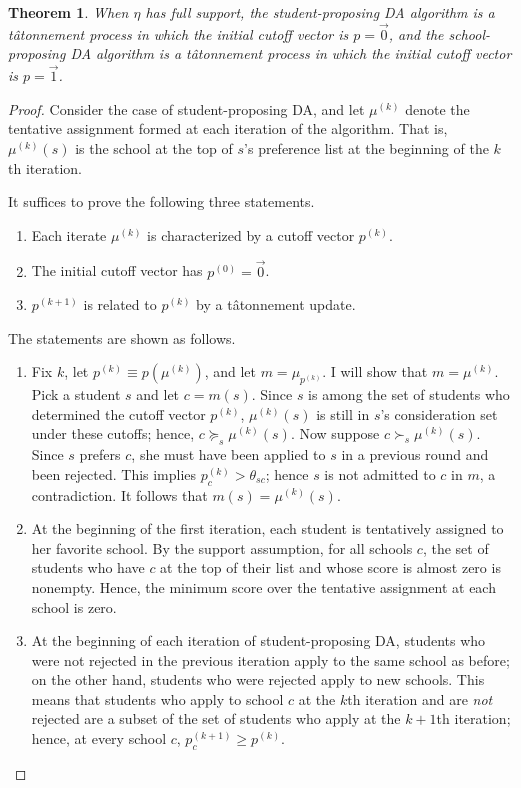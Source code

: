 \documentclass[12pt]{article}
\numberwithin{equation}{subsection}
\newtheorem{theorem}{Theorem}
\theoremstyle{definition}
\begin{document}
\begin{theorem}When $\eta$ has full support, the student-proposing DA algorithm is a t\^{a}tonnement process in which the initial cutoff vector is $p = \vec 0$, and the school-proposing DA algorithm is a t\^{a}tonnement process in which the initial cutoff vector is $p = \vec 1$. \end{theorem}
\begin{proof}
Consider the case of student-proposing DA, and let $\mu^{(k)}$ denote the tentative assignment formed at each iteration of the algorithm. That is, $\mu^{(k)}(s)$ is the school at the top of $s$’s preference list at the beginning of the $k$th iteration.

It suffices to prove the following three statements.
\begin{enumerate}
\item Each iterate $\mu^{(k)}$ is characterized by a cutoff vector $p^{(k)}$.
\item The initial cutoff vector has $p^{(0)} = \vec 0$.
\item $p^{(k+1)}$ is related to $p^{(k)}$ by a t\^{a}tonnement update.
\end{enumerate}
The statements are shown as follows. 
\begin{enumerate}
\item Fix $k$, let $p^{(k)} \equiv p\left(\mu^{(k)}\right)$, and let $m = \mu_{p^{(k)}}$. I will show that $m = \mu^{(k)}$. Pick a student $s$ and let $c = m(s)$. Since $s$ is among the set of students who determined the cutoff vector $p^{(k)}$, $ \mu^{(k)}(s)$ is still in $s$’s consideration set under these cutoffs; hence,  $c \succeq_s \mu^{(k)}(s)$.  Now suppose $c \succ_s \mu^{(k)}(s)$. Since $s$ prefers $c$, she must have been applied to $s$ in a previous round and been rejected. This implies $p^{(k)}_{c} > \theta_{sc}$; hence $s$ is not admitted to $c$ in $m$, a contradiction. It follows that $m(s) = \mu^{(k)}(s)$. 

\item At the beginning of the first iteration, each student is tentatively assigned to her favorite school. By the support assumption, for all schools $c$, the set of students who have $c$ at the top of their list and whose score is almost zero is nonempty. Hence, the minimum score over the tentative assignment at each school is zero.

\item At the beginning of each iteration of student-proposing DA, students who were not rejected in the previous iteration apply to the same school as before; on the other hand, students who were rejected apply to new schools. This means that students who apply to school $c$ at the $k$th iteration and are \emph{not} rejected are a subset of the set of students who apply at the $k+1$th iteration; hence, at every school $c$, $p_c^{(k+1)} \geq p^{(k)}$.


\end{enumerate}
\end{proof}
\end{document}
